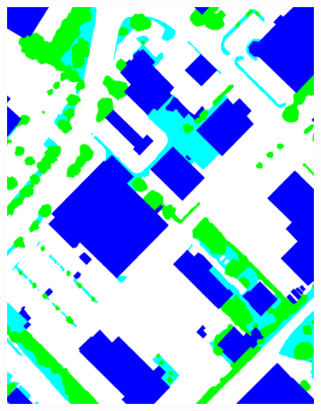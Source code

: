 \begin{figure}[htb]
\begin{subfigure}{0.19\textwidth}
  \includegraphics[width=1\linewidth]{fig/vai/32_gt.png}
\end{subfigure}


\end{figure}
